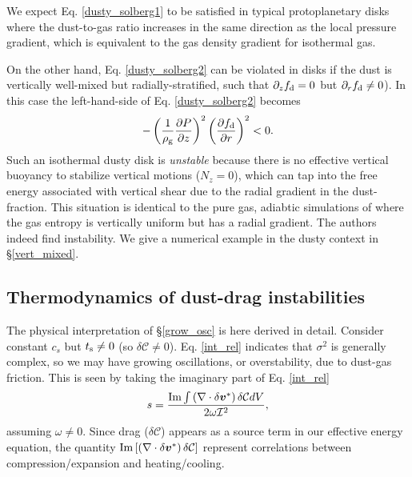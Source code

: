 We expect Eq. \ref{dusty_solberg1} to be satisfied in typical
protoplanetary disks where the dust-to-gas ratio increases in the same
direction as the local pressure gradient, which is equivalent to the
gas density gradient for isothermal gas. 

On the other hand, Eq. \ref{dusty_solberg2} can be violated in
disks if the dust is vertically well-mixed but radially-stratified,  
such that $\partial_zf_\mathrm{d} = 0$ but $\partial_rf_\mathrm{d}\neq0$). In this case the
left-hand-side of Eq. \ref{dusty_solberg2} becomes
\begin{align}
-\left(\frac{1}{\rho_\mathrm{g}}\frac{\partial P}{\partial
    z}\right)^2\left(\frac{\partial f_\mathrm{d}}{\partial r}\right)^2<0.
\end{align}
Such an isothermal dusty disk is \emph{unstable} because there is no
effective vertical buoyancy to stabilize vertical motions ($N_z=0$),
which can tap into the free energy associated with  
vertical shear due to the radial gradient in the dust-fraction. 
This situation is identical to the pure gas, adiabtic simulations of \cite{nelson13}
where the gas entropy is vertically uniform but has a radial
gradient. The authors indeed find instability. We give a numerical
example in the dusty context in \S\ref{vert_mixed}.   

\subsection{Thermodynamics of dust-drag instabilities}\label{dust_work}
The physical interpretation of \S\ref{grow_osc} is here derived in
detail. Consider constant $c_s$ but $t_\mathrm{s}\neq0$ (so $\delta\mathcal{C}
\neq 0$). Eq. \ref{int_rel} indicates that $\sigma^2$ is generally complex, so
we may have growing oscillations, or overstability, due to dust-gas
friction. This is seen by taking the imaginary part of
Eq. \ref{int_rel} 
\begin{align}
  s = \frac{\operatorname{Im}\int \left(\nabla\cdot\delta\bm{v}^*\right)\delta\mathcal{C}dV}{2\omega\mathcal{I}^2}, \label{thermal_instability}
\end{align} 
assuming $\omega\neq0$. %
Since drag ($\delta \mathcal{C}$) appears as a source term in our
effective energy equation, the quantity 
$\operatorname{Im}\left[\left(\nabla\cdot\delta\bm{v}^*\right)\delta\mathcal{C}\right]$
represent correlations between compression/expansion and  
heating/cooling.  

